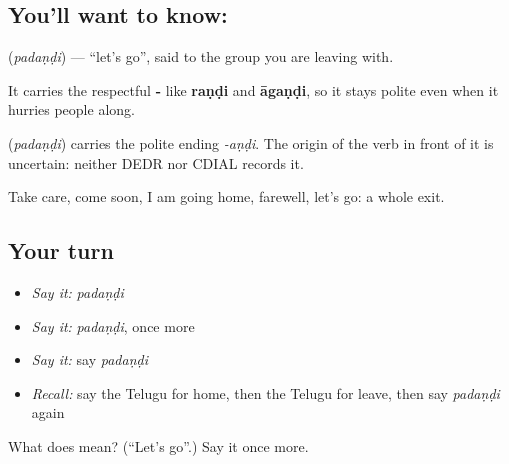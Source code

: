 \subsection*{You'll want to know: }
\textbf{} (\emph{padaṇḍi}) — \textquotedblleft{}let's go\textquotedblright{}, said to the group you are leaving with.

It carries the respectful \textbf{-} like \textbf{raṇḍi} and \textbf{āgaṇḍi}, so it stays polite even when it hurries people along.

\begin{cousinweb}
\textbf{} (\emph{padaṇḍi}) carries the polite ending \emph{-aṇḍi}. The origin of the verb in front of it is uncertain: neither DEDR nor CDIAL records it.
\end{cousinweb}

\begin{grammarlens}[title={What you've built}]
Take care, come soon, I am going home, farewell, let's go: a whole exit.
\end{grammarlens}

\subsection*{Your turn}
\begin{itemize}
\raggedright
  \item \emph{Say it:} \emph{padaṇḍi}
  \item \emph{Say it:} \emph{padaṇḍi}, once more
  \item \emph{Say it:} say \emph{padaṇḍi}
  \item \emph{Recall:} say the Telugu for home, then the Telugu for leave, then say \emph{padaṇḍi} again
\end{itemize}

\begin{tcolorbox}[breakable,colback=teal!4,colframe=teal!35!black,title={Before you move on}]
What does  mean? (\textquotedblleft{}Let's go\textquotedblright{}.) Say it once more.
\end{tcolorbox}
